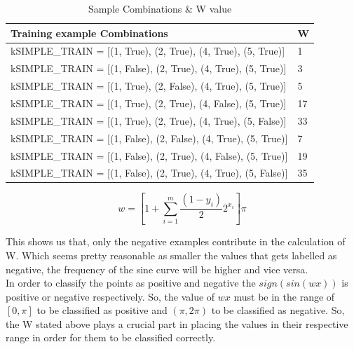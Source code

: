 \documentclass{article}
\begin{document}
\begin{table}[H]
\centering
\caption{Sample Combinations \& W value}
\label{my-label}
\begin{tabular}{|l|l|}
\hline
Training example  Combinations & W \\
\hline
kSIMPLE\_TRAIN = {[}(1, True), (2, True), (4, True), (5, True){]}   & 1  \\
kSIMPLE\_TRAIN = {[}(1, False), (2, True), (4, True), (5, True){]}  & 3  \\
kSIMPLE\_TRAIN = {[}(1, True), (2, False), (4, True), (5, True){]}  & 5  \\
kSIMPLE\_TRAIN = {[}(1, True), (2, True), (4, False), (5, True){]}  & 17 \\
kSIMPLE\_TRAIN = {[}(1, True), (2, True), (4, True), (5, False){]}  & 33 \\
kSIMPLE\_TRAIN = {[}(1, False), (2, False), (4, True), (5, True){]} & 7  \\
kSIMPLE\_TRAIN = {[}(1, False), (2, True), (4, False), (5, True){]} & 19 \\
kSIMPLE\_TRAIN = {[}(1, False), (2, True), (4, True), (5, False){]} & 35 \\
\hline
\end{tabular}
\end{table}

$$ w = [1 + \sum_{i=1}^{m} \dfrac{(1-y_i)}{2} 2^{x_i}] \pi$$  

This shows us that, only the negative examples contribute in the calculation of W.
Which seems pretty reasonable as smaller the values that gets labelled as negative, the frequency of the sine curve will be higher and vice versa.\\

In order to classify the points as positive and negative the $sign(sin(wx))$ is positive or negative respectively. So, the value of $wx$ must be in the range of $[0,\pi]$ to be classified as positive and $(\pi,2\pi)$ to be classified as negative. So, the W stated above plays a crucial part in placing the values in their respective range in order for them to be classified correctly.
\end{document}
